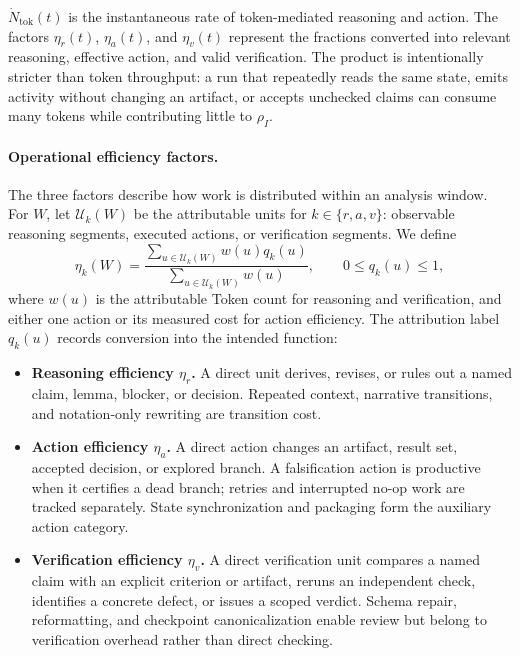 $\dot N_{\mathrm{tok}}(t)$ is the instantaneous rate of token-mediated reasoning
and action. The factors $\eta_r(t)$, $\eta_a(t)$, and $\eta_v(t)$ represent the
fractions converted into relevant reasoning, effective action, and valid
verification. The product is intentionally stricter than token throughput: a run
that repeatedly reads the same state, emits activity without changing an artifact,
or accepts unchecked claims can consume many tokens while contributing little to
$\rho_I$.

\paragraph{Operational efficiency factors.}
The three factors describe how work is distributed within an analysis window. For
$W$, let $\mathcal{U}_k(W)$ be the attributable units for
$k\in\{r,a,v\}$: observable reasoning segments, executed actions, or verification
segments. We define
\begin{equation}
  \eta_k(W)
  =\frac{\sum_{u\in\mathcal{U}_k(W)} w(u)q_k(u)}
         {\sum_{u\in\mathcal{U}_k(W)} w(u)},
  \qquad 0\leq q_k(u)\leq1,
  \label{eq:operational-efficiency}
\end{equation}
where $w(u)$ is the attributable Token count for reasoning and verification, and
either one action or its measured cost for action efficiency. The attribution label
$q_k(u)$ records conversion into the intended function:

\begin{itemize}
  \item \textbf{Reasoning efficiency $\eta_r$.} A direct unit derives, revises, or
    rules out a named claim, lemma, blocker, or decision. Repeated context,
    narrative transitions, and notation-only rewriting are transition cost.
  \item \textbf{Action efficiency $\eta_a$.} A direct action changes an artifact,
    result set, accepted decision, or explored branch. A falsification action is
    productive when it certifies a dead branch; retries and interrupted no-op work
    are tracked separately. State synchronization and packaging form the auxiliary
    action category.
  \item \textbf{Verification efficiency $\eta_v$.} A direct verification unit
    compares a named claim with an explicit criterion or artifact, reruns an
    independent check, identifies a concrete defect, or issues a scoped verdict.
    Schema repair, reformatting, and checkpoint canonicalization enable review but
    belong to verification overhead rather than direct checking.
\end{itemize}

